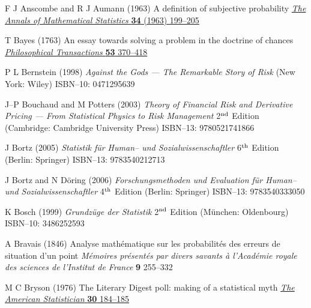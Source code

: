 \begin{thebibliography}{99}

F J Anscombe and R J Aumann
(1963) A definition of subjective probability
\href{http://www.jstor.org/stable/2991295}{\textit{The Annals of 
Mathematical Statistics} \textbf{34} (1963) 199--205}

T Bayes
(1763) An essay towards solving a problem in the doctrine of 
chances
\href{http://dx.doi.org/10.1098/rstl.1763.0053}{\textit{Philosophical
Transactions} \textbf{53} 370--418}

P L Bernstein
(1998) \textit{Against the Gods --- The Remarkable Story of Risk}
(New York: Wiley) ISBN--10: 0471295639

J--P Bouchaud and M Potters
(2003) \textit{Theory of Financial Risk and Derivative Pricing
--- From Statistical Physics to Risk Management}
2$^{\rm nd}$ Edition (Cambridge: Cambridge University Press)
ISBN--13: 9780521741866

J Bortz
(2005) \textit{Statistik f\"ur Human-- und Sozialwissenschaftler}
6$^{\rm th}$ Edition (Berlin: Springer) ISBN--13: 9783540212713

J Bortz and N D\"{o}ring
(2006) \textit{Forschungsmethoden und Evaluation f\"ur Human-- und 
Sozialwissenschaftler}
4$^{\rm th}$ Edition (Berlin: Springer) ISBN--13: 9783540333050

K Bosch
(1999) \textit{Grundz\"uge der Statistik}
2$^{\rm nd}$ Edition (M\"unchen: Oldenbourg) ISBN--10: 3486252593

A Bravais
(1846) Analyse math\'{e}matique sur les probabilit\'{e}s des 
erreurs de situation d'un point
\textit{M\'{e}moires pr\'{e}sent\'{e}s par divers savants \`{a} 
l'Acad\'{e}mie royale des sciences de l'Institut de France} \textbf{
9} 255--332

M C Bryson
(1976) The Literary Digest poll: making of a statistical myth
\href{http://dx.doi.org/10.1080/00031305.1976.10479173}{\textit{The 
American Statistician} \textbf{30} 184--185}


\end{thebibliography}
